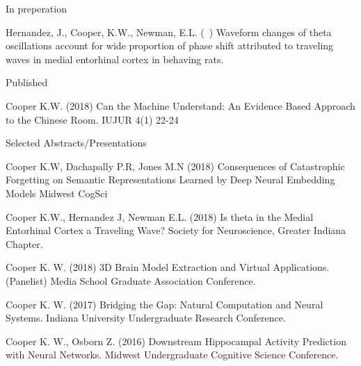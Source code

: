 \begin{cvpubentries}


\iftrue
  \cvpubentry
    {In preperation} %
    { } %
    { } %
    { } %
    {
      \begin{cvpubitems} %
        \item {Hernandez,  J.,  Cooper,  K.W.,  Newman,  E.L.  (~)  Waveform  changes  of  theta  oscillations  account  for  wide  proportion  of  phase  shift  attributed  to  traveling  waves  in  medial  entorhinal  cortex  in  behaving  rats. }
      \end{cvpubitems}
    }
\fi

\iffalse
  \cvpubentry
    {In press} %
    {} %
    {} %
    {} %
    {
      \begin{cvpubitems} %
        \item {pub}
      \end{cvpubitems}
    }
\fi

  \cvpubentry
    {Published} %
    {} %
    {} %
    {} %
    {
      \begin{cvpubitems} %
        \item {Cooper K.W. (2018) Can the Machine Understand: An Evidence Based Approach to the Chinese Room. IUJUR 4(1) 22-24}
      \end{cvpubitems}
    }
\iffalse %
\fi

\cvpubentry
    {Selected Abstracts/Presentations} %
    {} %
    {} %
    {} %
    {
      \begin{cvpubitems} %
        \item {Cooper K.W, Dachapally P.R, Jones M.N (2018) Consequences of Catastrophic Forgetting on Semantic Representations Learned by Deep Neural Embedding Models Midwest CogSci}
	\item{Cooper K.W., Hernandez J, Newman E.L. (2018) Is theta in the Medial Entorhinal Cortex a Traveling Wave? Society for Neuroscience, Greater Indiana Chapter.}
	\item{Cooper K. W. (2018) 3D Brain Model Extraction and Virtual Applications. (Panelist) Media School Graduate Association Conference.}
	\item{Cooper K. W. (2017) Bridging the Gap: Natural Computation and Neural Systems. Indiana University Undergraduate Research Conference.}
	\item{Cooper K. W., Osborn Z. (2016) Downstream Hippocampal Activity Prediction with Neural Networks. Midwest Undergraduate Cognitive Science Conference.}
      \end{cvpubitems}
    }

\end{cvpubentries}

